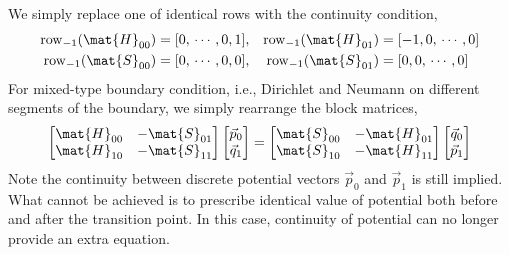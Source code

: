 \documentclass{jfm}
\begin{document}
We simply replace one of identical rows with the continuity condition,
\begin{equation}\begin{aligned}
\mathrm{row}_{-1}(\mat{H}_{00}) &= [0, \,\cdots ,0 , 1],&
\mathrm{row}_{-1}(\mat{H}_{01}) &= [-1,0, \,\cdots ,0 ]\\
\mathrm{row}_{-1}(\mat{S}_{00}) &= [0, \,\cdots ,0 , 0],&
\mathrm{row}_{-1}(\mat{S}_{01}) &= [0,0, \,\cdots ,0 ]
\end{aligned}\end{equation}
For mixed-type boundary condition, i.e., Dirichlet and Neumann on different segments of the boundary,
we simply rearrange the block matrices,
\begin{equation}
\begin{bmatrix}
\mat{H}_{00}&-\mat{S}_{01}\\\mat{H}_{10}&-\mat{S}_{11}
\end{bmatrix}
\begin{bmatrix}
\vec{p}_0\\\vec{q}_1
\end{bmatrix}
=\begin{bmatrix}
\mat{S}_{00}&-\mat{H}_{01}\\\mat{S}_{10}&-\mat{H}_{11}
\end{bmatrix}
\begin{bmatrix}
\vec{q}_0\\\vec{p}_1
\end{bmatrix}
\end{equation}
Note the continuity between discrete potential vectors $\vec{p}_0$ and $\vec{p}_1$
is still implied. What cannot be achieved is to prescribe identical value of potential both before and after the transition point.
In this case, continuity of potential can no longer provide an extra equation.
\end{document}
